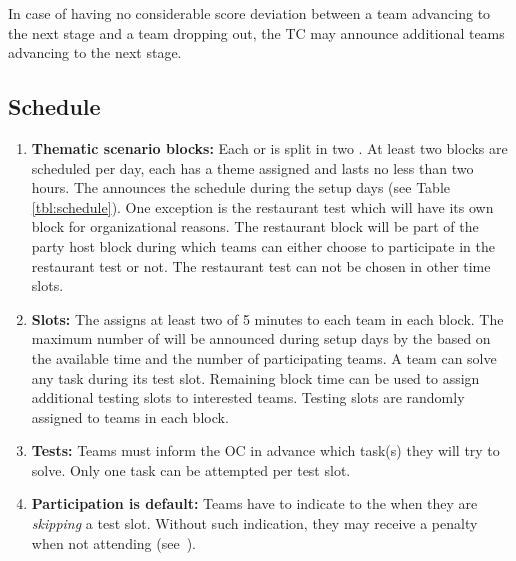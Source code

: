 In case of having no considerable score deviation between a team advancing to the next stage and a team dropping out, the TC may announce additional teams advancing to the next stage.


\subsection{Schedule}
\label{rule:schedule}

\begin{enumerate}
	\item \textbf{Thematic scenario blocks:} Each  or  is split in two .
	At least two blocks are scheduled per day, each has a theme assigned and lasts no less than two hours.
	The  announces the schedule during the setup days (see Table \ref{tbl:schedule}). One exception is the restaurant test which will have its own block for organizational reasons. The restaurant block will be part of the  party host block during which teams can either choose to participate in the restaurant test or not. The restaurant test can not be chosen in other time slots.

	\item \textbf{Slots:} The  assigns at least two  of 5 minutes to each team in each block.
   The maximum number of  will be announced during setup days by the  based on the available time and the number of participating teams.
	A team can solve any task during its test slot.
	Remaining block time can be used to assign additional testing slots to interested teams.
	Testing slots are randomly assigned to teams in each block.

	\item \textbf{Tests:} Teams must inform the OC in advance which task(s) they will try to solve.
	Only one task can be attempted per test slot.

	\item \textbf{Participation is default:} Teams have to indicate to the  when they are \emph{skipping} a test slot. Without such indication, they may receive a penalty when not attending (see~).
\end{enumerate}

